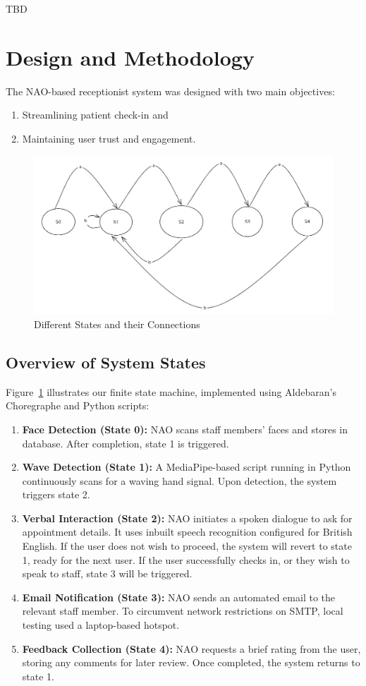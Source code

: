 \documentclass[conference]{IEEEtran}
\begin{document}
TBD

\section{Design and Methodology}

The NAO-based receptionist system was designed with two main objectives:
\begin{enumerate}
        \item Streamlining patient check-in and
        \item Maintaining user trust and engagement.
\end{enumerate}

\begin{figure}
        \centering
        \includegraphics[width=.6\linewidth]{states.jpg}
        \caption{Different States and their Connections}
        \label{Different states}
\end{figure}

\subsection{Overview of System States} Figure~\ref{Different states} illustrates our finite state machine, implemented
using Aldebaran’s Choregraphe and Python scripts:

\begin{enumerate} \item \textbf{Face Detection (State 0):} NAO scans staff members’ faces and stores in database. After completion, state 1 is triggered.
        \item \textbf{Wave Detection (State 1):} A MediaPipe-based script running in Python continuously scans for a waving hand signal. Upon detection, the system triggers state 2. 
        \item \textbf{Verbal Interaction (State 2):} NAO initiates a spoken dialogue to ask for appointment details. It uses inbuilt speech recognition configured for British English. If the user does not wish to proceed, the system will revert to state 1, ready for the next user. If the user successfully checks in, or they wish to speak to staff, state 3 will be triggered.
        \item \textbf{Email Notification (State 3):} NAO sends an automated email to the relevant staff member. To circumvent network restrictions on SMTP, local testing used a laptop-based hotspot.
        \item \textbf{Feedback Collection (State 4):} NAO requests a brief rating from the user, storing any comments for later review. Once completed, the system returns to state 1.
\end{enumerate}
\end{document}
